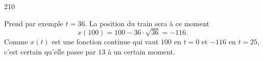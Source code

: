 

\begin{corrige}{210}

Prend par exemple $t=36$. La position du train sera à ce moment 
\[ 
  x(100)=100-36\cdot\sqrt{36}=-116.
\]
Comme $x(t)$ est une fonction continue qui vaut $100$ en $t=0$ et $-116$ en $t=25$, c'est certain qu'elle passe par $13$ à un certain moment.

\end{corrige}
